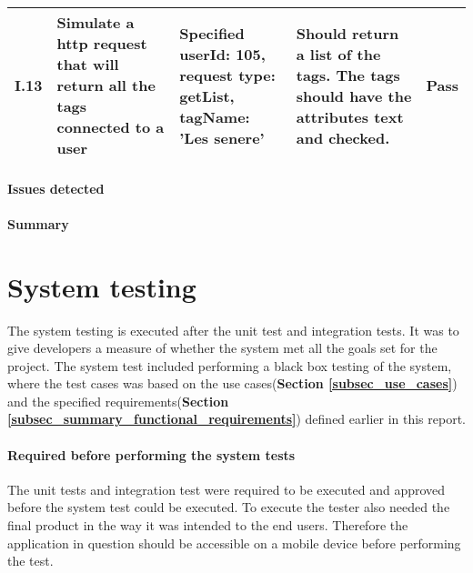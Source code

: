 {{\begin{longtable}{| p{1cm} | p{5.5cm} | p{3cm} | p{5.5cm} | p{2cm} |}
					
			I.13 & Simulate a http request that will return all the tags connected to a user  & Specified userId: 105, \newline request type: getList, \newline tagName: 'Les senere' & Should return a list of the tags. The tags should have the attributes text and checked. & Pass\\ \hline	

\end{longtable}

\paragraph{Issues detected}

\paragraph{Summary}


\section{System testing}

The system testing is executed after the unit test and integration tests. It was to give developers a measure of whether the system met all the goals set for the project.  The system test included performing a black box testing of the system, where the test cases was based on the use cases(\textbf{Section \ref{subsec_use_cases}}) and the specified requirements(\textbf{Section \ref{subsec_summary_functional_requirements}})  defined earlier in this report. \newline

\paragraph{Required before performing the system tests}
The unit tests and integration test were required to be executed and approved before the system test could be executed. To execute the tester also needed the final product in the way it was intended to the end users. Therefore the application in question should be accessible on a mobile device before performing the test. \newline

}}

